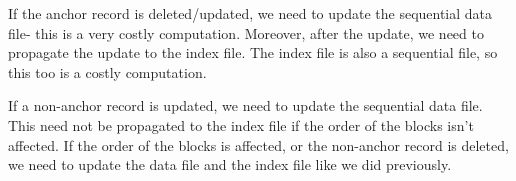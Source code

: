 \documentclass[a4paper, openany]{memoir}
\begin{document}
If the anchor record is deleted/updated, we need to update the sequential data file- this is a very costly computation. Moreover, after the update, we need to propagate the update to the index file. The index file is also a sequential file, so this too is a costly computation.

If a non-anchor record is updated, we need to update the sequential data file. This need not be propagated to the index file if the order of the blocks isn't affected. If the order of the blocks is affected, or the non-anchor record is deleted, we need to update the data file and the index file like we did previously.


\end{document}
